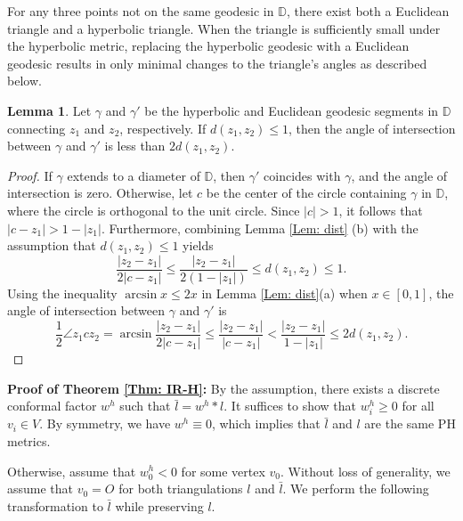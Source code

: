\documentclass[12pt]{amsart}
\theoremstyle{definition}
\newtheorem{lemma}[theorem]{Lemma}
\begin{document}
For any three points not on the same geodesic in $\mathbb{D}$, there exist both a Euclidean triangle and a hyperbolic triangle.
When the triangle is sufficiently small under the hyperbolic metric, replacing the hyperbolic geodesic with a Euclidean geodesic results in only minimal changes to the triangle's angles as described below. 
\begin{lemma}\label{angle}
Let $\gamma$ and $\gamma'$ be the hyperbolic and Euclidean geodesic segments in $\mathbb{D}$ connecting $z_1$ and $z_2$, respectively.
If $d(z_1, z_2)\leq 1$, then the angle of intersection between $\gamma$ and $\gamma'$ is less than $2d(z_1, z_2)$.
\end{lemma}
\begin{proof}
If $\gamma$ extends to a diameter of $\mathbb{D}$, then $\gamma'$ coincides with $\gamma$, and the angle of intersection is zero.
Otherwise, let $c$ be the center of the circle containing $\gamma$ in $\mathbb{D}$, where the circle is orthogonal to the unit circle.
Since $|c|>1$, it follows that $|c-z_1|>1-|z_1|$.
Furthermore, combining Lemma \ref{Lem: dist} (b) with the assumption that $d(z_1,z_2)\leq 1$ yields
\begin{equation*}
\frac{|z_2-z_1|}{2|c-z_1|}
\leq \frac{|z_2-z_1|}{2(1-|z_1|)}
\leq d(z_1, z_2)\leq 1.
\end{equation*}
Using the inequality $\arcsin x \leq 2x$ in Lemma \ref{Lem: dist}(a) when $x\in [0, 1]$, the angle of intersection between $\gamma$ and $\gamma'$ is
\begin{equation*}
\frac{1}{2}\angle z_1cz_2
=\arcsin \frac{|z_2-z_1|}{2|c-z_1|}
\leq \frac{|z_2-z_1|}{|c-z_1|}
<\frac{|z_2-z_1|}{1-|z_1|}
\leq 2d(z_1,z_2).
\end{equation*}
\end{proof}


\noindent\textbf{Proof of Theorem \ref{Thm: IR-H}:}
By the assumption, there exists a discrete conformal factor $w^h$ such that $\bar{l}=w^h*l$.
It suffices to show that $w_i^h\geq 0$ for all $v_i\in V$.
By symmetry, we have $w^h\equiv0$, which implies that $\bar{l}$ and $l$ are the same PH metrics.

Otherwise, assume that $w^h_0<0$ for some vertex $v_0$.
Without loss of generality, we assume that $v_0=O$ for both triangulations $l$ and $\bar l$.
We perform the following transformation to $\bar{l}$ while preserving $l$.
\end{document}
